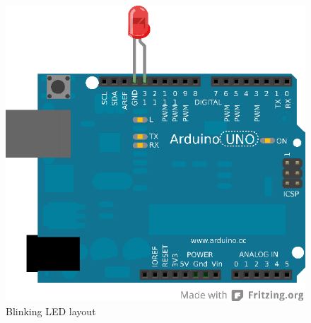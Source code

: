 \begin{figure}[htbp]
  \centering
  \includegraphics[width=0.7\linewidth]{figures/blinkingLED-NEW.eps}
  \caption{Blinking LED layout
  \label{fig:blinkingLEDLayout}}
\end{figure}
